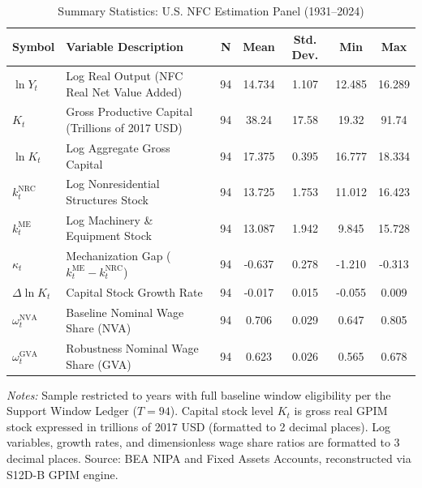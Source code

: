 \begin{table}[h!]
\centering
\begin{threeparttable}
\caption{Summary Statistics: U.S. NFC Estimation Panel (1931--2024)}
\label{tab:41:summary_stats}
\begin{tabular}{l p{7.0cm} c c c c c}
\toprule
\textbf{Symbol} & \textbf{Variable Description} & \textbf{N} & \textbf{Mean} & \textbf{Std. Dev.} & \textbf{Min} & \textbf{Max} \\
\midrule
$\ln Y_t$ & Log Real Output (NFC Real Net Value Added) & 94 & 14.734 & 1.107 & 12.485 & 16.289 \\
$K_t$ & Gross Productive Capital (Trillions of 2017 USD) & 94 & 38.24 & 17.58 & 19.32 & 91.74 \\
$\ln K_t$ & Log Aggregate Gross Capital & 94 & 17.375 & 0.395 & 16.777 & 18.334 \\
$k_t^{\text{NRC}}$ & Log Nonresidential Structures Stock & 94 & 13.725 & 1.753 & 11.012 & 16.423 \\
$k_t^{\text{ME}}$ & Log Machinery \& Equipment Stock & 94 & 13.087 & 1.942 & 9.845 & 15.728 \\
$\kappa_t$ & Mechanization Gap ($k_t^{\text{ME}} - k_t^{\text{NRC}}$) & 94 & -0.637 & 0.278 & -1.210 & -0.313 \\
$\Delta \ln K_t$ & Capital Stock Growth Rate & 94 & -0.017 & 0.015 & -0.055 & 0.009 \\
$\omega_t^{\text{NVA}}$ & Baseline Nominal Wage Share (NVA) & 94 & 0.706 & 0.029 & 0.647 & 0.805 \\
$\omega_t^{\text{GVA}}$ & Robustness Nominal Wage Share (GVA) & 94 & 0.623 & 0.026 & 0.565 & 0.678 \\
\bottomrule
\end{tabular}
\begin{tablenotes}
\small
\item \textit{Notes:} Sample restricted to years with full baseline window eligibility per the Support Window Ledger ($T=94$). Capital stock level $K_t$ is gross real GPIM stock expressed in trillions of 2017 USD (formatted to 2 decimal places). Log variables, growth rates, and dimensionless wage share ratios are formatted to 3 decimal places. Source: BEA NIPA and Fixed Assets Accounts, reconstructed via S12D-B GPIM engine.
\end{tablenotes}
\end{threeparttable}
\end{table}